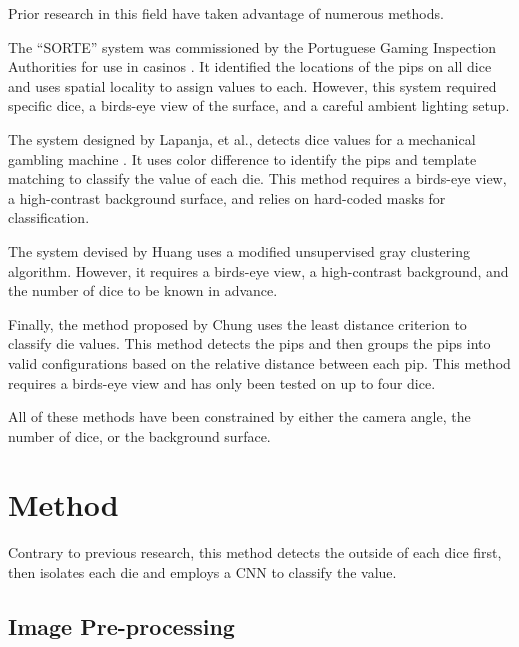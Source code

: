 \documentclass[conference]{IEEEtran}
\begin{document}

Prior research in this field have taken advantage of numerous methods.

The ``SORTE'' system was commissioned by the Portuguese Gaming Inspection Authorities for use in casinos \cite{Correia1995}.
It identified the locations of the pips on all dice and uses spatial locality to assign values to each.
However, this system required specific dice, a birds-eye view of the surface, and a careful ambient lighting setup.

The system designed by Lapanja, et al., detects dice values for a mechanical gambling machine \cite{Lapanjaa}.
It uses color difference to identify the pips and template matching to classify the value of each die.
This method requires a birds-eye view, a high-contrast background surface, and relies on hard-coded masks for classification.

The system devised by Huang \cite{Huang2008} uses a modified unsupervised gray clustering algorithm. 
However, it requires a birds-eye view, a high-contrast background, and the number of dice to be known in advance.

Finally, the method proposed by Chung \cite{Chung2009} uses the least distance criterion to classify die values.
This method detects the pips and then groups the pips into valid configurations based on the relative distance between each pip.
This method requires a birds-eye view and has only been tested on up to four dice.

All of these methods have been constrained by either the camera angle, the number of dice, or the background surface.

\section{Method}

Contrary to previous research, this method detects the outside of each dice first, then isolates each die and employs a CNN to classify the value.

\subsection{Image Pre-processing}
\end{document}
